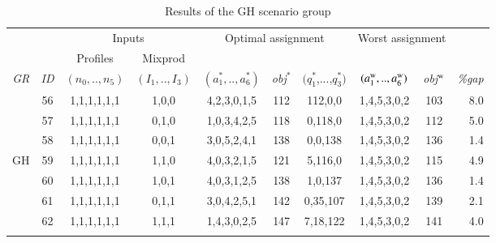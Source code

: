 \documentclass[review,12pt, 3p, times]{elsarticle}
\begin{document}
					
					
\begin{longtable}{|c|c|c|c|c|c|c|c|c|r|}
	\hline
	& & \multicolumn{2}{c|}{Inputs} & \multicolumn{3}{c|}{Optimal assignment} & \multicolumn{2}{c|}{Worst assignment }& \\
	& \multicolumn{1}{c|}{ } & \multicolumn{1}{c|}{Profiles} & \multicolumn{1}{c|}{Mixprod}& \multicolumn{1}{c}{}  & \multicolumn{2}{c|}{} & \multicolumn{2}{c|}{}&\multicolumn{1}{c|}{}\\
	\it{GR}            & \it{ID} & \multicolumn{1}{c|}{$(n_0,..,n_5)$} & \multicolumn{1}{c|}{$(I_1,..,I_3)$} & {$(a^*_1,..,a^*_6)$} & \it{obj}$^*$ & $(q^*_1$,...,$q^*_3)$ & {$(a^{\textsc{w}}_1,..,a^{\textsc{w}}_6)$} & \it{obj}$^{\textsc{w}}$ & \it{\%gap} \\ %
									
	\hline 
									
	                   & 56      & 1,1,1,1,1,1                         & 1,0,0                               & 4,2,3,0,1,5          & 112          & 112,0,0               & 1,4,5,3,0,2                                & 103                     & 8.0        \\
	                   & 57      & 1,1,1,1,1,1                         & 0,1,0                               & 1,0,3,4,2,5          & 118          & 0,118,0               & 1,4,5,3,0,2                                & 112                     & 5.0        \\
	                   & 58      & 1,1,1,1,1,1                         & 0,0,1                               & 3,0,5,2,4,1          & 138          & 0,0,138               & 1,4,5,3,0,2                                & 136                     & 1.4        \\
	{GH}\label{SEN:GH} & 59      & 1,1,1,1,1,1                         & 1,1,0                               & 4,0,3,2,1,5          & 121          & 5,116,0               & 1,4,5,3,0,2                                & 115                     & 4.9        \\
	                   & 60      & 1,1,1,1,1,1                         & 1,0,1                               & 4,0,3,1,2,5          & 138          & 1,0,137               & 1,4,5,3,0,2                                & 136                     & 1.4        \\
	                   & 61      & 1,1,1,1,1,1                         & 0,1,1                               & 3,0,4,2,5,1          & 142          & 0,35,107              & 1,4,5,3,0,2                                & 139                     & 2.1        \\
	                   & 62      & 1,1,1,1,1,1                         & 1,1,1                               & 1,4,3,0,2,5          & 147          & 7,18,122              & 1,4,5,3,0,2                                & 141                     & 4.0        \\
									
									        
	\hline
	\caption{Results of the GH scenario group} 
	\label{tab:tr4}
\end{longtable}
			
\end{document}

